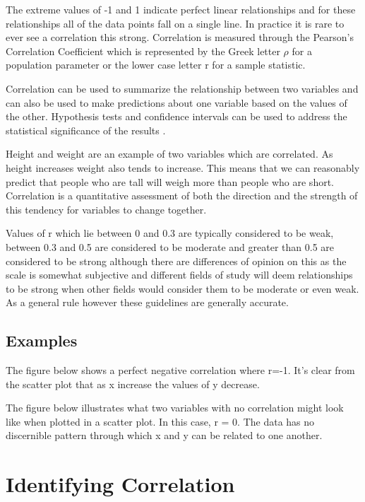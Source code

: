 \documentclass[
]{book}
\begin{document}
The extreme values of -1 and 1 indicate perfect linear relationships and for these relationships all of the data points fall on a single line. In practice it is rare to ever see a correlation this strong. Correlation is measured through the Pearson's Correlation Coefficient which is represented by the Greek letter \(\rho\) for a population parameter or the lower case letter r for a sample statistic.

Correlation can be used to summarize the relationship between two variables and can also be used to make predictions about one variable based on the values of the other. Hypothesis tests and confidence intervals can be used to address the statistical significance of the results \citep{schober}.

Height and weight are an example of two variables which are correlated. As height increases weight also tends to increase. This means that we can reasonably predict that people who are tall will weigh more than people who are short. Correlation is a quantitative assessment of both the direction and the strength of this tendency for variables to change together.

Values of r which lie between 0 and 0.3 are typically considered to be weak, between 0.3 and 0.5 are considered to be moderate and greater than 0.5 are considered to be strong although there are differences of opinion on this as the scale is somewhat subjective and different fields of study will deem relationships to be strong when other fields would consider them to be moderate or even weak. As a general rule however these guidelines are generally accurate.

\hypertarget{examples}{%
\subsection{Examples}\label{examples}}

The figure below shows a perfect negative correlation where r=-1. It's clear from the scatter plot that as x increase the values of y decrease.

The figure below illustrates what two variables with no correlation might look like when plotted in a scatter plot. In this case, r = 0. The data has no discernible pattern through which x and y can be related to one another.

\hypertarget{identifying-correlation}{%
\section{Identifying Correlation}\label{identifying-correlation}}
\end{document}
